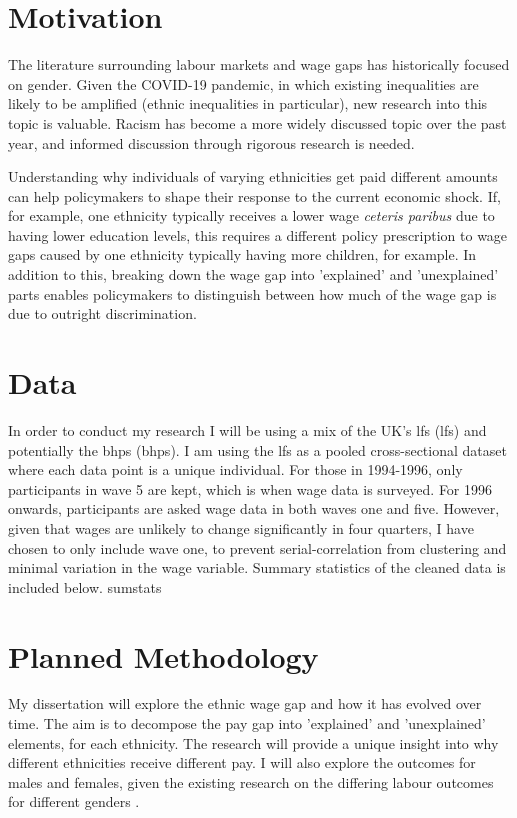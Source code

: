 \documentclass[class=article, crop=false]{standalone}
\begin{document}
\section{Motivation}
The literature surrounding labour markets and wage gaps has historically focused on gender. Given the COVID-19 pandemic, in which existing inequalities are likely to be amplified (ethnic inequalities in particular), new research into this topic is valuable. Racism has become a more widely discussed topic over the past year, and informed discussion through rigorous research is needed.

Understanding why individuals of varying ethnicities get paid different amounts can help policymakers to shape their response to the current economic shock. If, for example, one ethnicity typically receives a lower wage \textit{ceteris paribus} due to having lower education levels, this requires a different policy prescription to wage gaps caused by one ethnicity typically having more children, for example. In addition to this, breaking down the wage gap into 'explained' and 'unexplained' parts enables policymakers to distinguish between how much of the wage gap is due to outright discrimination.

\section{Data}
In order to conduct my research I will be using a mix of the UK's \acrlong{lfs} (\acrshort{lfs}) and potentially the \acrlong{bhps} (\acrshort{bhps}). I am using the \acrshort{lfs} as a pooled cross-sectional dataset where each data point is a unique individual. For those in 1994-1996, only participants in wave 5 are kept, which is when wage data is surveyed. For 1996 onwards, participants are asked wage data in both waves one and five. However, given that wages are unlikely to change significantly in four quarters, I have chosen to only include wave one, to prevent serial-correlation from clustering and minimal variation in the wage variable. Summary statistics of the cleaned data is included below.
{sumstats}

\section{Planned Methodology}
My dissertation will explore the ethnic wage gap and how it has evolved over time. The aim is to decompose the pay gap into 'explained' and 'unexplained' elements, for each ethnicity. The research will provide a unique insight into why different ethnicities receive different pay. I will also explore the outcomes for males and females, given the existing research on the differing labour outcomes for different genders \citep{BoE}.
\end{document}
